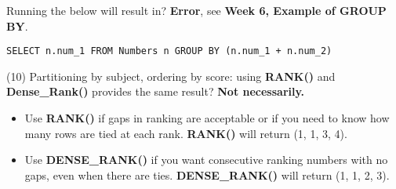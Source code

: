 \documentclass[10pt,landscape]{article}
\newcommand{\sql}[1]{{\color{cyan} \textbf{#1}}}
\newcommand{\ans}[1]{{\color{purple} \textbf{#1}}}
\begin{document}
\begin{multicols}{4}
Running the below will result in? \ans{Error}, see \textbf{Week 6, Example of GROUP BY}.

\begin{lstlisting}
SELECT n.num_1 FROM Numbers n GROUP BY (n.num_1 + n.num_2)
\end{lstlisting}

(10) Partitioning by subject, ordering by score: using \sql{RANK()} and \sql{Dense\_Rank()} provides the same result? \ans{Not necessarily.}

\begin{itemize}
	\item Use \sql{RANK()} if gaps in ranking are acceptable or if you need to know how many rows are tied at each rank. \sql{RANK()} will return (1, 1, 3, 4).
	\item Use \sql{DENSE\_RANK()} if you want consecutive ranking numbers with no gaps, even when there are ties. \sql{DENSE\_RANK()} will return (1, 1, 2, 3).
\end{itemize}


\end{multicols}
\end{document}
